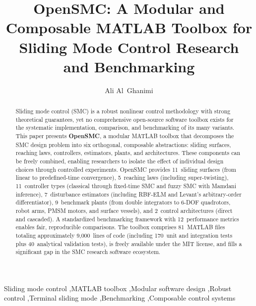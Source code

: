 \documentclass[preprint,12pt]{elsarticle}
\begin{document}
\begin{frontmatter}

\title{OpenSMC: A Modular and Composable MATLAB Toolbox for Sliding Mode Control Research and Benchmarking}

\author[kufa]{Ali Al~Ghanimi}


\begin{abstract}
Sliding mode control (SMC) is a robust nonlinear control methodology with strong theoretical guarantees, yet no comprehensive open-source software toolbox exists for the systematic implementation, comparison, and benchmarking of its many variants. This paper presents \textbf{OpenSMC}, a modular MATLAB toolbox that decomposes the SMC design problem into six orthogonal, composable abstractions: sliding surfaces, reaching laws, controllers, estimators, plants, and architectures. These components can be freely combined, enabling researchers to isolate the effect of individual design choices through controlled experiments. OpenSMC provides 11~sliding surfaces (from linear to predefined-time convergence), 5~reaching laws (including super-twisting), 11~controller types (classical through fixed-time SMC and fuzzy SMC with Mamdani inference), 7~disturbance estimators (including RBF-ELM and Levant's arbitrary-order differentiator), 9~benchmark plants (from double integrators to 6-DOF quadrotors, robot arms, PMSM motors, and surface vessels), and 2~control architectures (direct and cascaded). A standardized benchmarking framework with 12~performance metrics enables fair, reproducible comparisons. The toolbox comprises 81~MATLAB files totaling approximately 9,000~lines of code (including 170~unit and integration tests plus 40~analytical validation tests), is freely available under the MIT license, and fills a significant gap in the SMC research software ecosystem.
\end{abstract}

\begin{keyword}
Sliding mode control \sep MATLAB toolbox \sep Modular software design \sep Robust control \sep Terminal sliding mode \sep Benchmarking \sep Composable control systems
\end{keyword}

\end{frontmatter}
\end{document}
